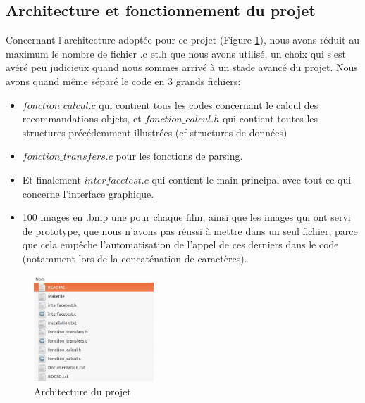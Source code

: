 \documentclass[light]{ceri}
\begin{document}
\subsection{Architecture et fonctionnement du projet}
    Concernant l'architecture adoptée pour ce projet (Figure \ref{archi}), nous avons réduit au maximum le nombre de fichier .c et.h que nous avons utilisé, un choix qui s'est avéré peu judicieux quand nous sommes arrivé à un stade avancé du projet.
    Nous avons quand même séparé le code en 3 grands fichiers:
    \begin{itemize}
        \item $fonction\_calcul.c$ qui contient tous les codes concernant le calcul des recommandations objets, et $fonction\_calcul.h$ qui contient toutes les structures précédemment illustrées (cf structures de données) 
        \item $fonction\_transfers.c$ pour les fonctions de parsing.
        \item Et finalement $interfacetest.c$ qui contient le main principal avec tout ce qui concerne l'interface graphique.
        \item 100 images en .bmp une pour chaque film, ainsi que les images qui ont servi de prototype, que nous n'avons pas réussi à mettre dans un seul fichier, parce que cela empêche l'automatisation de l'appel de ces derniers dans le code (notamment lors de la concaténation de caractères). 
    \end{itemize}
    
    \begin{figure}[!h]

        \centering
        \includegraphics[width=0.4\textwidth]{images/archi.png} 
      \caption{Architecture du projet}
        \label{archi}

\end{figure}   
\end{document}
